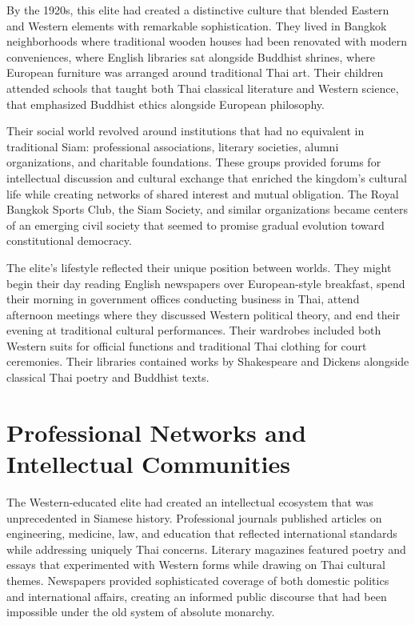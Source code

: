 \documentclass[
  Letterpaper,
]{scrbook}
\begin{document}
By the 1920s, this elite had created a distinctive culture that blended
Eastern and Western elements with remarkable sophistication. They lived
in Bangkok neighborhoods where traditional wooden houses had been
renovated with modern conveniences, where English libraries sat
alongside Buddhist shrines, where European furniture was arranged around
traditional Thai art. Their children attended schools that taught both
Thai classical literature and Western science, that emphasized Buddhist
ethics alongside European philosophy.

Their social world revolved around institutions that had no equivalent
in traditional Siam: professional associations, literary societies,
alumni organizations, and charitable foundations. These groups provided
forums for intellectual discussion and cultural exchange that enriched
the kingdom's cultural life while creating networks of shared interest
and mutual obligation. The Royal Bangkok Sports Club, the Siam Society,
and similar organizations became centers of an emerging civil society
that seemed to promise gradual evolution toward constitutional
democracy.

The elite's lifestyle reflected their unique position between worlds.
They might begin their day reading English newspapers over
European-style breakfast, spend their morning in government offices
conducting business in Thai, attend afternoon meetings where they
discussed Western political theory, and end their evening at traditional
cultural performances. Their wardrobes included both Western suits for
official functions and traditional Thai clothing for court ceremonies.
Their libraries contained works by Shakespeare and Dickens alongside
classical Thai poetry and Buddhist texts.

\section{Professional Networks and Intellectual
Communities}\label{professional-networks-and-intellectual-communities}

The Western-educated elite had created an intellectual ecosystem that
was unprecedented in Siamese history. Professional journals published
articles on engineering, medicine, law, and education that reflected
international standards while addressing uniquely Thai concerns.
Literary magazines featured poetry and essays that experimented with
Western forms while drawing on Thai cultural themes. Newspapers provided
sophisticated coverage of both domestic politics and international
affairs, creating an informed public discourse that had been impossible
under the old system of absolute monarchy.
\end{document}
